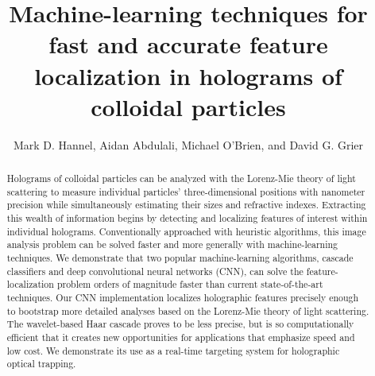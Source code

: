 \documentclass[10pt,letterpaper]{article}
\begin{document}
\title{Machine-learning techniques for 
  fast and accurate feature localization in
  holograms of colloidal particles}

\author{Mark D. Hannel, 
  Aidan Abdulali, 
  Michael O'Brien, and 
  David G. Grier}

\address{Department of Physics 
  and Center for Soft Matter Research, 
  New York University, New York, NY 10003, USA\\
  Packer Collegiate Institute, Brooklyn, NY 11201, USA}

\begin{abstract}  
  Holograms of colloidal particles can be analyzed with the Lorenz-Mie
  theory of light scattering to measure individual particles'
  three-dimensional positions with nanometer precision
  while simultaneously estimating their sizes and refractive indexes.
  Extracting this wealth of information
  begins by detecting and localizing features of interest within
  individual holograms.  Conventionally approached with heuristic
  algorithms, this image analysis problem can be solved faster and more
  generally with machine-learning techniques.  We demonstrate that two
  popular machine-learning algorithms, cascade classifiers and deep
  convolutional neural networks (CNN), can solve the feature-localization
  problem orders of magnitude faster than current state-of-the-art
  techniques.
  Our CNN implementation localizes holographic features precisely enough
  to bootstrap more detailed analyses based on the Lorenz-Mie theory of
  light scattering.
  The wavelet-based Haar cascade proves to be less
  precise, but is so computationally
  efficient that it creates new opportunities for applications
  that emphasize speed and low cost.
  We demonstrate its use as a real-time targeting system for
  holographic optical trapping.
\end{abstract}


% 
% 
\end{document}
